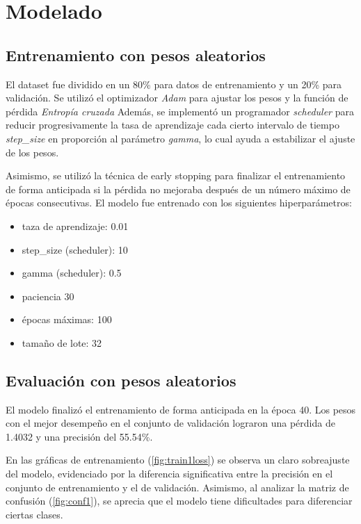 \documentclass[twocolumn]{article}
\begin{document}
\section{Modelado}
\subsection{Entrenamiento con pesos aleatorios}
El dataset fue dividido en un 80\% para datos de entrenamiento y un 20\% para validación. Se utilizó el optimizador \textit{Adam} para ajustar los pesos y la función de pérdida \textit{Entropía cruzada} Además, se implementó un programador \textit{scheduler} para reducir progresivamente la tasa de aprendizaje cada cierto intervalo de tiempo \textit{step\_size} en proporción al parámetro \textit{gamma}, lo cual ayuda a estabilizar el ajuste de los pesos.

Asimismo, se utilizó la técnica de early stopping para finalizar el entrenamiento de forma anticipada si la pérdida no mejoraba después de un número máximo de épocas consecutivas. El modelo fue entrenado con los siguientes hiperparámetros:

\begin{itemize}
    \setlength\itemsep{0.1em}
    \item taza de aprendizaje: 0.01
    \item step\_size (scheduler): 10
    \item gamma (scheduler): 0.5
    \item paciencia 30
    \item épocas máximas: 100
    \item tamaño de lote: 32
\end{itemize}

\subsection{Evaluación con pesos aleatorios}
El modelo finalizó el entrenamiento de forma anticipada en la época 40. Los pesos con el mejor desempeño en el conjunto de validación lograron una pérdida de 1.4032 y una precisión del 55.54\%.

En las gráficas de entrenamiento (\ref{fig:train1loss}) se observa un claro sobreajuste del modelo, evidenciado por la diferencia significativa entre la precisión en el conjunto de entrenamiento y el de validación. Asimismo, al analizar la matriz de confusión (\ref{fig:conf1}), se aprecia que el modelo tiene dificultades para diferenciar ciertas clases.
\end{document}
